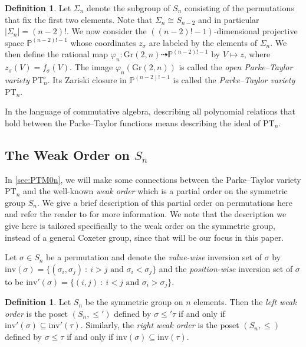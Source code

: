 \documentclass[12pt, reqno]{amsart}
\numberwithin{equation}{section}
\theoremstyle{plain}
\theoremstyle{definition}
\newtheorem{definition}[theorem]{Definition}
\newcommand{\pt}{\mathrm{PT}}
\newcommand{\inv}{\mathrm{inv}}
\begin{document}
\begin{definition}\label{def:pt}
    Let $\Sigma_n$ denote the subgroup of $S_n$ consisting of the permutations that fix the first two elements. Note that $\Sigma_n\cong S_{n-2}$ and in particular $|\Sigma_n|=(n-2)!$. We now consider the $((n-2)!-1)$-dimensional projective space $\mathbb{P}^{(n-2)!-1}$ whose coordinates $z_\sigma$ are labeled by the elements of $\Sigma_n$. We then define the rational map 
$\varphi_n: \mathrm{Gr}(2,n)\dashrightarrow \mathbb{P}^{(n-2)!-1}$ by $V\mapsto z$, where $z_\sigma(V) = f_\sigma(V)$. The image $\varphi_n(\mathrm{Gr}(2,n))$ is called the \emph{open Parke--Taylor variety} $\mathrm{PT}^\circ_n$. Its Zariski closure in $\mathbb{P}^{(n-2)!-1}$ is called the \emph{Parke--Taylor variety} $\mathrm{PT}_n$.
\end{definition}
In the language of commutative algebra, describing all polynomial relations that hold between the Parke--Taylor functions means describing the ideal of $\mathrm{PT}_n$.

\subsection{The Weak Order on $S_n$}
In \cref{sec:PTM0n}, we will make some connections between the Parke--Taylor variety $\pt_n$ and the well-known \emph{weak order} which is a partial order on the symmetric group $S_n$. We give a brief description of this partial order on permutations here and refer the reader to \cite{bjornerbrenticoxeter} for more information. We note that the description we give here is tailored specifically to the weak order on the symmetric group, instead of a general Coxeter group, since that will be our focus in this paper. 


Let $\sigma \in S_n$ be a permutation and denote the \emph{value-wise} inversion set of $\sigma$ by $\inv(\sigma) = \{(\sigma_i, \sigma_j) ~:~  i > j \text{ and } \sigma_i < \sigma_j \}$ and the \emph{position-wise} inversion set of $\sigma$ to be $\inv'(\sigma) = \{(i, j) ~:~  i < j \text{ and } \sigma_i > \sigma_j \}$.

\begin{definition}
Let $S_n$ be the symmetric group on $n$ elements. Then the \emph{left weak order} is the poset $(S_n, \leq' )$ defined by $\sigma \leq' \tau$ if and only if $\inv'(\sigma) \subseteq \inv'(\tau)$. Similarly, the \emph{right weak order} is the poset $(S_n, \leq)$ defined by $\sigma \leq \tau$ if and only if $\inv(\sigma) \subseteq \inv(\tau)$.
\end{definition}
\end{document}
